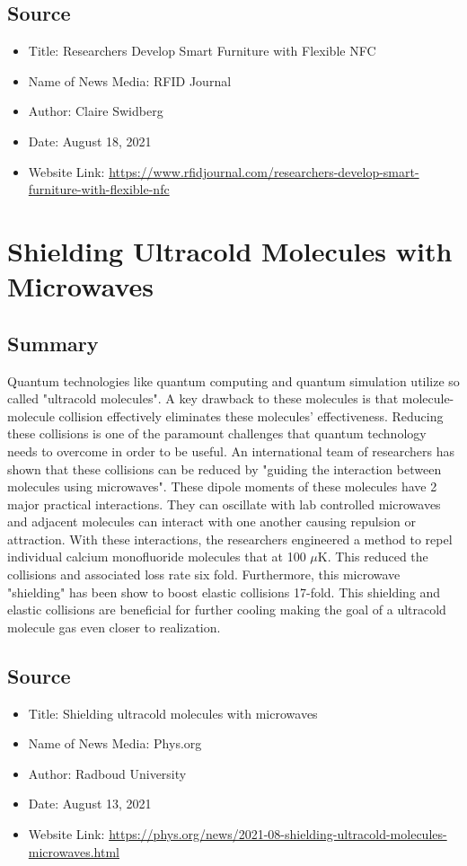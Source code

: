 \documentclass{article}
\begin{document}
\subsection*{Source}
\begin{itemize}
  \item Title: Researchers Develop Smart Furniture with Flexible NFC
  \item Name of News Media: RFID Journal
  \item Author: Claire Swidberg
  \item Date: August 18, 2021
  \item Website Link: \url{https://www.rfidjournal.com/researchers-develop-smart-furniture-with-flexible-nfc}
\end{itemize}

\section*{Shielding Ultracold Molecules with Microwaves}

\subsection*{Summary}
Quantum technologies like quantum computing and quantum simulation 
utilize so called "ultracold molecules".
A key drawback to these molecules is that molecule-molecule
collision effectively eliminates these molecules' effectiveness.
Reducing these collisions is one of the paramount challenges that 
quantum technology needs to overcome in order to be useful.
An international team of researchers has shown that these collisions
can be reduced by "guiding the interaction between molecules using
microwaves". These dipole moments of these molecules have 2 major practical interactions.
They can oscillate with lab controlled microwaves and adjacent molecules can interact with one another
causing repulsion or attraction. With these interactions, the researchers engineered a method
to repel individual calcium monofluoride molecules that at 100 $\mu$K. This reduced the collisions 
and associated loss rate six fold. Furthermore, this microwave "shielding" 
has been show to boost elastic collisions 17-fold. This shielding and elastic collisions 
are beneficial for further cooling making the goal of a ultracold molecule
gas even closer to realization.

\subsection*{Source}
\begin{itemize}
  \item Title: Shielding ultracold molecules with microwaves
  \item Name of News Media: Phys.org
  \item Author: Radboud University
  \item Date: August 13, 2021 
  \item Website Link: \url{https://phys.org/news/2021-08-shielding-ultracold-molecules-microwaves.html}
\end{itemize}
\end{document}
